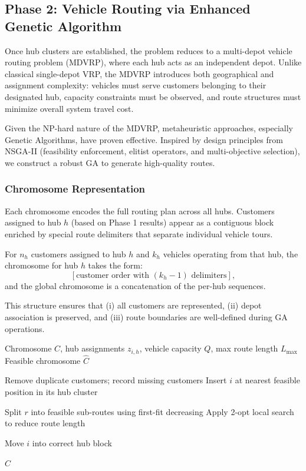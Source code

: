 \documentclass[conference]{IEEEtran}
\begin{document}
\subsection{Phase 2: Vehicle Routing via Enhanced Genetic Algorithm}

Once hub clusters are established, the problem reduces to a multi-depot vehicle routing problem (MDVRP), where each hub acts as an independent depot. Unlike classical single-depot VRP, the MDVRP introduces both geographical and assignment complexity: vehicles must serve customers belonging to their designated hub, capacity constraints must be observed, and route structures must minimize overall system travel cost.

Given the NP-hard nature of the MDVRP, metaheuristic approaches, especially Genetic Algorithms, have proven effective. Inspired by design principles from NSGA-II (feasibility enforcement, elitist operators, and multi-objective selection), we construct a robust GA to generate high-quality routes.

\subsubsection{Chromosome Representation}

Each chromosome encodes the full routing plan across all hubs. Customers assigned to hub $h$ (based on Phase 1 results) appear as a contiguous block enriched by special route delimiters that separate individual vehicle tours.

For $n_h$ customers assigned to hub $h$ and $k_h$ vehicles operating from that hub, the chromosome for hub $h$ takes the form:
\[
[\text{customer order with } (k_h - 1) \text{ delimiters}],
\]
and the global chromosome is a concatenation of the per-hub sequences.

This structure ensures that (i) all customers are represented, (ii) depot association is preserved, and (iii) route boundaries are well-defined during GA operations.

\begin{algorithm}[htbp]
\caption{Chromosome Feasibility Check and Repair}
\begin{algorithmic}[1]
\REQUIRE Chromosome $C$, hub assignments $z_{i,h}$, vehicle capacity $Q$, max route length $L_{\max}$
\ENSURE Feasible chromosome $\hat{C}$

\STATE Remove duplicate customers; record missing customers
    \STATE Insert $i$ at nearest feasible position in its hub cluster
\ENDFOR

        \STATE Split $r$ into feasible sub-routes using first-fit decreasing
    \ENDIF
        \STATE Apply 2-opt local search to reduce route length
    \ENDIF
\ENDFOR

        \STATE Move $i$ into correct hub block
    \ENDIF
\ENDFOR

\RETURN $\hat{C}$
\end{algorithmic}
\end{algorithm}
\end{document}
